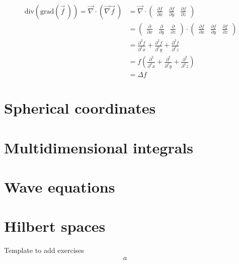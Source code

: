   \begin{align*}
  \text{div}(\text{grad}(\vec f\,)) = \vec\nabla \cdot \left(\vec\nabla \vec f\,\right) 
    & = 
      \vec\nabla \cdot
      \begin{pmatrix} 
        \frac{\partial f}{\partial x} &
        \frac{\partial f}{\partial y} &
        \frac{\partial f}{\partial z}
      \end{pmatrix} \\
    & =
      \begin{pmatrix} 
        \frac{\partial}{\partial x} &
        \frac{\partial}{\partial y} &
        \frac{\partial}{\partial z}
      \end{pmatrix}
      \cdot
      \begin{pmatrix} 
        \frac{\partial f}{\partial x} &
        \frac{\partial f}{\partial y} &
        \frac{\partial f}{\partial z}
      \end{pmatrix} \\
    & =  
      \frac{\partial^2 f}{\partial^2 x} +
      \frac{\partial^2 f}{\partial^2 y} +
      \frac{\partial^2 f}{\partial^2 z} \\
    & = f
      \left(
      \frac{\partial^2}{\partial^2 x} +
      \frac{\partial^2}{\partial^2 y} +
      \frac{\partial^2}{\partial^2 z}
      \right) \\
    & = \Delta f
  \end{align*}

  
\section{Spherical coordinates}

\section{Multidimensional integrals}

\section{Wave equations}

\section{Hilbert spaces}

  Template to add exercises
  \begin{align*}
    a &
      & \\
  \end{align*}
